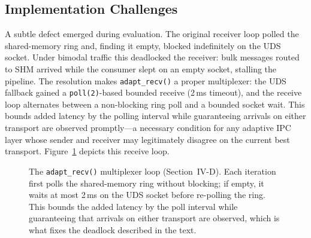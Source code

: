 \documentclass[conference]{IEEEtran}
\begin{document}
\subsection{Implementation Challenges}
A subtle defect emerged during evaluation. The original receiver loop polled
the shared-memory ring and, finding it empty, blocked indefinitely on the UDS
socket. Under bimodal traffic this deadlocked the receiver: bulk messages
routed to SHM arrived while the consumer slept on an empty socket, stalling
the pipeline. The resolution makes \texttt{adapt\_recv()} a proper
multiplexer: the UDS fallback gained a \texttt{poll(2)}-based bounded receive
(2\,ms timeout), and the receive loop alternates between a non-blocking ring
poll and a bounded socket wait. This bounds added latency by the polling
interval while guaranteeing arrivals on either transport are observed
promptly---a necessary condition for any adaptive IPC layer whose sender and
receiver may legitimately disagree on the current best transport.
Figure~\ref{fig:mux} depicts this receive loop.

\begin{figure}[t]
\centering
{}
\caption{The \texttt{adapt\_recv()} multiplexer loop
(Section~IV-D). Each iteration first polls the shared-memory ring without
blocking; if empty, it waits at most 2\,ms on the UDS socket before
re-polling the ring. This bounds the added latency by the poll interval
while guaranteeing that arrivals on either transport are observed,
which is what fixes the deadlock described in the text.}
\label{fig:mux}
\end{figure}
\end{document}
